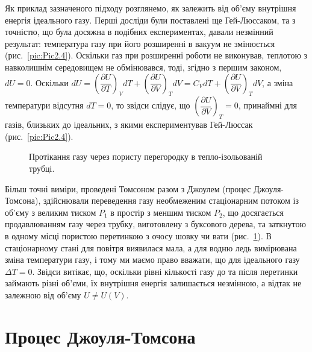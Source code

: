 Як приклад зазначеного підходу розглянемо, як залежить від об'єму внутрішня енергія ідеального газу.
Перші досліди були поставлені ще Гей-Люссаком, та з точністю, що була досяжна в подібних
експериментах, давали незмінний результат: температура газу при його розширенні в вакуум не змінюється
(рис.~\ref{pic:Pic2.4}). Оскільки газ при розширенні роботи не виконував, теплотою з навколишнім
середовищем не обмінювався, тоді, згідно з першим законом, $dU=0$. Оскільки $dU =
\left(\dfrac{\partial U}{\partial T}\right)_VdT + \left(\dfrac{\partial U}{\partial V}\right)_TdV =
C_VdT+\left(\dfrac{\partial U}{\partial V}\right)_T dV$, а зміна температури відсутня $dT=0$, то
звідси слідує, що $\left(\dfrac{\partial U}{\partial V}\right)_T =0$, принаймні для газів, близьких до
ідеальних, з якими експериментував Гей-Люссак (рис.~\ref{pic:Pic2.4}).

\begin{figure}[h!]\centering
	
	\caption{Протікання газу через пористу перегородку в тепло-ізольованій трубці.}
	\label{pic:Pic2.5}
\end{figure}

Більш точні виміри, проведені Томсоном разом з Джоулем (процес Джоуля-Томсона), здійснювали
переведення газу необмеженим стаціонарним потоком із об'єму з великим тиском $P_1$ в простір з
меншим тиском $P_2$, що досягається продавлюванням газу через трубку, виготовлену з буксового
дерева, та заткнутою в одному місці пористою перетинкою з очосу шовку чи вати
(рис.~\ref{pic:Pic2.5}). В стаціонарному стані для повітря виявилася мала, а для водню ледь
вимірювана зміна температури газу, і тому ми маємо право вважати, що для ідеального газу $\Delta T =
0$. Звідси витікає, що, оскільки рівні кількості газу до та після перетинки займають різні об'єми,
їх внутрішня енергія залишається незмінною, а відтак не залежною від об'єму $U \neq U(V)$.

\section{Процес Джоуля-Томсона}

